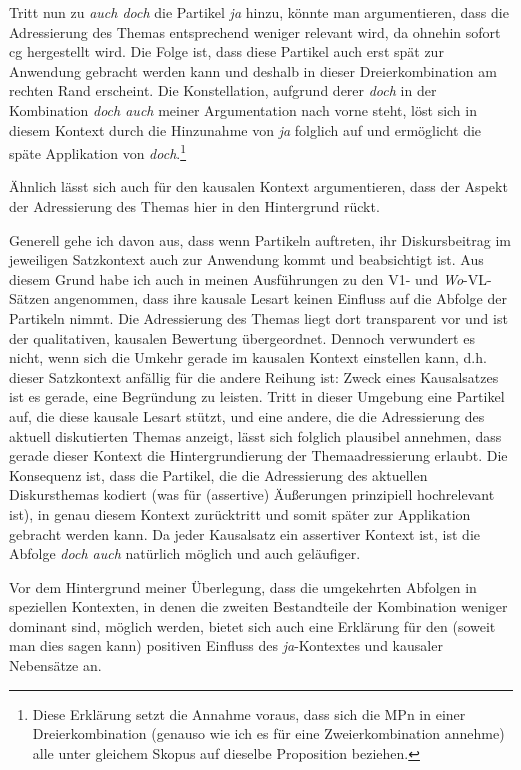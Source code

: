 {Tritt nun zu \textit{auch doch} die Partikel \textit{ja} hinzu, könnte man argumentieren, dass die Adressierung des Themas entsprechend weniger relevant wird, da ohnehin sofort cg hergestellt wird. Die Folge ist, dass diese Partikel auch erst spät zur Anwendung gebracht werden kann und deshalb in dieser Dreierkombination am rechten Rand erscheint. Die Konstellation, aufgrund derer \textit{doch} in der Kombination \textit{doch auch} meiner Argumentation nach vorne steht, löst sich in diesem Kontext durch die Hinzunahme von \textit{ja} folglich auf und ermöglicht die späte Applikation von \textit{doch}.\footnote{Diese Erklärung setzt die Annahme voraus, dass sich die MPn in einer Dreierkombination (genauso wie ich es für eine Zweierkombination annehme) alle unter gleichem Skopus auf dieselbe Proposition beziehen.}

Ähnlich lässt sich auch für den kausalen Kontext argumentieren, dass der Aspekt der Adressierung des Themas hier in den Hintergrund rückt. 

Generell gehe ich davon aus, dass wenn Partikeln auftreten, ihr Diskursbeitrag im jeweiligen Satzkontext auch zur Anwendung kommt und beabsichtigt ist. Aus diesem Grund habe ich auch in meinen Ausführungen zu den V1- und \textit{Wo}-VL-Sätzen angenommen, dass ihre kausale Lesart keinen Einfluss auf die Abfolge der Partikeln nimmt. Die Adressierung des Themas liegt dort transparent vor und ist der qualitativen, kausalen Bewertung übergeordnet. Dennoch verwundert es nicht, wenn sich die Umkehr gerade im kausalen Kontext einstellen kann, d.h. dieser Satzkontext anfällig für die andere Reihung ist: Zweck eines Kausalsatzes ist es gerade, eine Begründung zu leisten. Tritt in dieser Umgebung eine Partikel auf, die diese kausale Lesart stützt, und eine andere, die die Adressierung des aktuell diskutierten Themas anzeigt, lässt sich folglich plausibel annehmen, dass gerade dieser Kontext die Hintergrundierung der Themaadressierung erlaubt. Die Konsequenz ist, dass die Partikel, die die Adressierung des aktuellen Diskursthemas kodiert (was für (assertive) Äußerungen prinzipiell hochrelevant ist), in genau diesem Kontext zurücktritt und somit später zur Applikation gebracht werden kann. Da jeder Kausalsatz ein assertiver Kontext ist, ist die Abfolge \textit{doch auch} natürlich möglich und auch geläufiger.

Vor dem Hintergrund meiner Überlegung, dass die umgekehrten Abfolgen in speziellen Kontexten, in denen die zweiten Bestandteile der Kombination weniger dominant sind, möglich werden, bietet sich auch eine Erklärung für den (soweit man dies sagen kann) positiven Einfluss des \textit{ja}-Kontextes und kausaler Nebensätze an.

}
